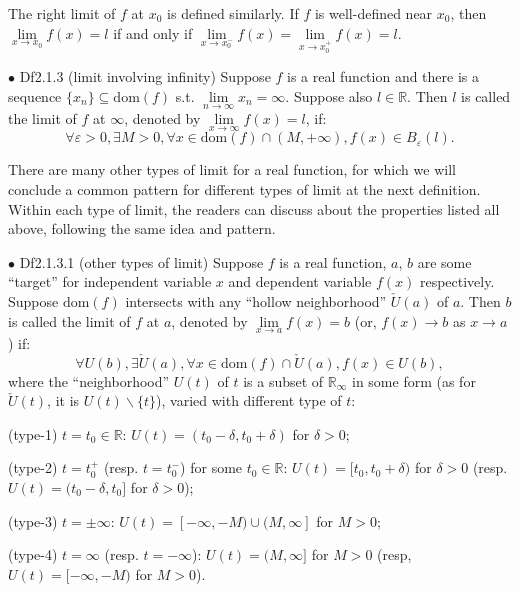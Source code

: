\documentclass{article}
\begin{document}
\begin{Rmk}{}
    The right limit of $f$ at $x_0$ is defined similarly. \textcolor{Th}{If $f$ is well-defined near $x_0$, then $\lim\limits_{x\rightarrow x_0}f(x) = l$ if and only if $\lim\limits_{x\rightarrow x_0^-}f(x) = \lim\limits_{x\rightarrow x_0^+}f(x) = l$.}
\end{Rmk}

\begin{Df}{$\bullet$ Df2.1.3 (limit involving infinity)}
    Suppose $f$ is a real function and there is a sequence $\{x_n\}\subseteq\text{dom}(f)$ s.t. $\lim\limits_{n\rightarrow\infty}x_n = \infty$. Suppose also $l\in\mathbb{R}$. Then $l$ is called the limit of $f$ at $\infty$, denoted by $\lim\limits_{x\rightarrow\infty}f(x) = l$, if:
    $$\forall\varepsilon>0, \exists M>0, \forall x\in\text{dom}(f)\cap(M, +\infty), f(x)\in B_\varepsilon(l).$$
\end{Df}

\begin{Rmk}{}
    There are many other types of limit for a real function, for which we will conclude a common pattern for different types of limit at the next definition. Within each type of limit, the readers can discuss about the properties listed all above, following the same idea and pattern. 
\end{Rmk}

\begin{Df}{$\bullet$ Df2.1.3.1 (other types of limit)}
    Suppose $f$ is a real function, $a$, $b$ are some ``target'' for independent variable $x$ and dependent variable $f(x)$ respectively. Suppose $\text{dom}(f)$ intersects with any ``hollow neighborhood'' $\check{U}(a)$ of $a$. Then $b$ is called the limit of $f$ at $a$, denoted by $\lim\limits_{x\to a} f(x) = b$ (or, $f(x)\rightarrow b$ as $x\rightarrow a$) if:
    $$\forall U(b), \exists\check{U}(a), \forall x\in\text{dom}(f)\cap \check{U}(a), f(x)\in U(b),$$
    where the ``neighborhood'' $U(t)$ of $t$ is a subset of $\mathbb{R}_\infty$ in some form (as for $\check{U}(t)$, it is $U(t)\backslash \{t\}$), varied with different type of $t$:
    \begin{compactitem}
        \item (type-1) $t = t_0\in\mathbb{R}$: $U(t) = (t_0-\delta, t_0+\delta)$ for $\delta>0$;
        \item (type-2) $t = t_0^+$ (resp. $t = t_0^-$) for some $t_0\in\mathbb{R}$: $U(t) = [t_0, t_0+\delta)$ for $\delta>0$ (resp. $U(t) = (t_0-\delta, t_0]$ for $\delta>0$);
        \item (type-3) $t = \pm\infty$: $U(t) = [-\infty, -M)\cup (M, \infty]$ for $M>0$;
        \item (type-4) $t = \infty$ (resp. $t = -\infty$): $U(t) = (M, \infty]$ for $M>0$ (resp, $U(t) = [-\infty, -M)$ for $M>0$).
    \end{compactitem}
\end{Df}
\end{document}
